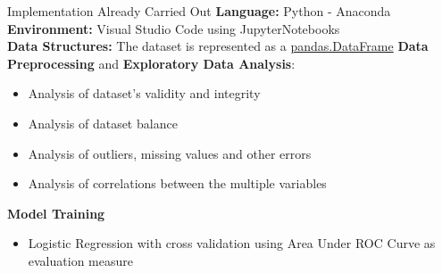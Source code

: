 


\begin{frame}{Implementation Already Carried Out}
    \textbf{Language: } Python - Anaconda \\
    \vspace{0.5em}
    \textbf{Environment: } Visual Studio Code using JupyterNotebooks \\
    \vspace{0.5em}
    \textbf{Data Structures:} 
    The dataset is represented as a
    \href{https://pandas.pydata.org/docs/reference/api/pandas.DataFrame.html}{pandas.DataFrame}
    \vspace{0.5em}
    \textbf{Data Preprocessing} and \textbf{Exploratory Data Analysis}:
    \begin{itemize}
        \item Analysis of dataset's validity and integrity
        \item Analysis of dataset balance
        \item Analysis of outliers, missing values and other errors
        \item Analysis of correlations between the multiple variables
    \end{itemize}
        \vspace{0.5em}
    \textbf{Model Training}
    \begin{itemize}
        \item Logistic Regression with cross validation using Area Under ROC Curve as evaluation measure
    \end{itemize}
\end{frame}
